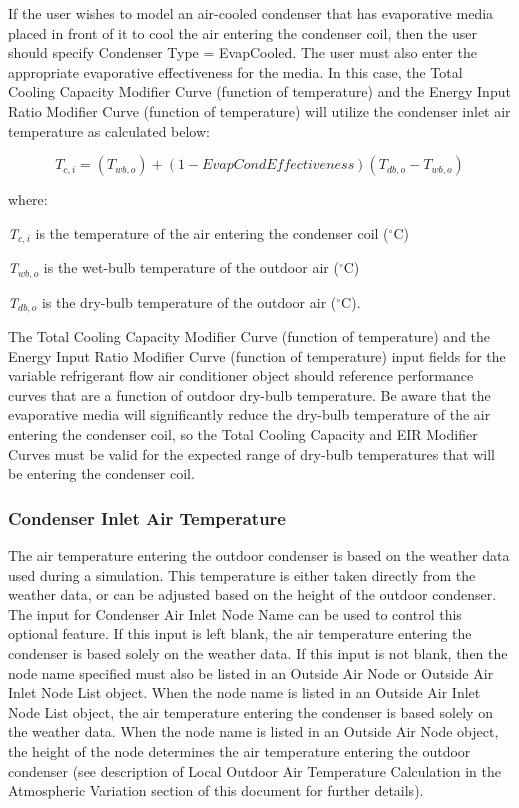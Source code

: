 If the user wishes to model an air-cooled condenser that has evaporative media placed in front of it to cool the air entering the condenser coil, then the user should specify Condenser Type = EvapCooled. The user must also enter the appropriate evaporative effectiveness for the media. In this case, the Total Cooling Capacity Modifier Curve (function of temperature) and the Energy Input Ratio Modifier Curve (function of temperature) will utilize the condenser inlet air temperature as calculated below:

\begin{equation}
{T_{c,i}} = \left( {{T_{wb,o}}} \right) + \left( {1 - EvapCondEffectiveness} \right)\left( {{T_{db,o}} - {T_{wb,o}}} \right)
\end{equation}

where:

\emph{T\(_{c,i}\)} is the temperature of the air entering the condenser coil (\(^{\circ}\)C)

\emph{T\(_{wb,o}\)} is the wet-bulb temperature of the outdoor air (\(^{\circ}\)C)

\emph{T\(_{db,o}\)} is the dry-bulb temperature of the outdoor air (\(^{\circ}\)C).

The Total Cooling Capacity Modifier Curve (function of temperature) and the Energy Input Ratio Modifier Curve (function of temperature) input fields for the variable refrigerant flow air conditioner object should reference performance curves that are a function of outdoor dry-bulb temperature. Be aware that the evaporative media will significantly reduce the dry-bulb temperature of the air entering the condenser coil, so the Total Cooling Capacity and EIR Modifier Curves must be valid for the expected range of dry-bulb temperatures that will be entering the condenser coil.

\subsubsection{Condenser Inlet Air Temperature}\label{condenser-inlet-air-temperature-2}

The air temperature entering the outdoor condenser is based on the weather data used during a simulation. This temperature is either taken directly from the weather data, or can be adjusted based on the height of the outdoor condenser. The input for Condenser Air Inlet Node Name can be used to control this optional feature. If this input is left blank, the air temperature entering the condenser is based solely on the weather data. If this input is not blank, then the node name specified must also be listed in an Outside Air Node or Outside Air Inlet Node List object. When the node name is listed in an Outside Air Inlet Node List object, the air temperature entering the condenser is based solely on the weather data. When the node name is listed in an Outside Air Node object, the height of the node determines the air temperature entering the outdoor condenser (see description of Local Outdoor Air Temperature Calculation in the Atmospheric Variation section of this document for further details).

